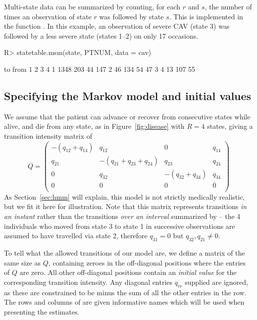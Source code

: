 \documentclass[article,shortnames]{jss}
\begin{document}
Multi-state data can be summarized by counting, for each $r$ and $s$,
the number of times an observation of state $r$ was followed by state
$s$.  This is implemented in the function .  In
this example, an observation of severe CAV (state 3) was followed by a
less severe state (states 1--2) on only 17 occasions.

\begin{CodeChunk}
\begin{CodeInput}
R> statetable.msm(state, PTNUM, data = cav)
\end{CodeInput}
\begin{CodeOutput}
    to
from    1    2    3    4
   1 1348  203   44  147
   2   46  134   54   47
   3    4   13  107   55
\end{CodeOutput}
\end{CodeChunk}

\subsection{Specifying the Markov model and initial values}
We assume that the patient can advance or recover from consecutive
states while alive, and die from any state, as in
Figure~\ref{fig:disease} with $R=4$ states, giving a transition
intensity matrix of
\[
Q = \left(
  \begin{array}{llll}
    -(q_{12} + q_{14}) & q_{12} &  0     & q_{14}\\
    q_{21} & -(q_{21}+q_{23}+q_{24}) & q_{23} & q_{24}\\
      0    & q_{32} & -(q_{32}+q_{34}) & q_{34}\\
      0    &   0    &   0    &   0   \\
  \end{array}
\right )
\]
As Section~\ref{sec:hmm} will explain, this model is not strictly
medically realistic, but we fit it here for illustration.  Note that
this matrix represents transitions \emph{in an instant} rather than
the transitions \emph{over an interval} summarized by
 -- the 4 individuals who moved from state 3 to
state 1 in successive observations are assumed to have travelled via
state 2, therefore $q_{31} = 0$ but $q_{32},q_{21} \neq 0$.

To tell  what the allowed transitions of our model are, we
define a matrix  of the same size as $Q$, containing
zeroes in the off-diagonal positions where the entries of $Q$ are
zero.  All other off-diagonal positions contain an \emph{initial
  value} for the corresponding transition intensity.  Any diagonal
entries $q_{rr}$ supplied are ignored, as these are constrained to be
minus the sum of all the other entries in the row.  The rows and
columns of  are given informative names which will be
used when presenting the estimates.
\end{document}
